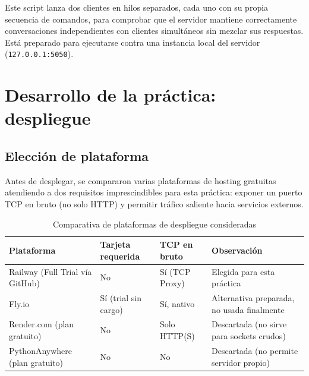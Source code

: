 \documentclass[12pt,a4paper]{article}
\begin{document}


Este script lanza dos clientes en hilos separados, cada uno con su propia secuencia de comandos, para comprobar que el servidor mantiene correctamente conversaciones independientes con clientes simultáneos sin mezclar sus respuestas. Está preparado para ejecutarse contra una instancia local del servidor (\texttt{127.0.0.1:5050}).



\section{Desarrollo de la práctica: despliegue}

\subsection{Elección de plataforma}

Antes de desplegar, se compararon varias plataformas de hosting gratuitas atendiendo a dos requisitos imprescindibles para esta práctica: exponer un puerto TCP en bruto (no solo HTTP) y permitir tráfico saliente hacia servicios externos.

\begin{table}[H]
\centering
\small
\begin{tabular}{@{}llll@{}}
\toprule
\textbf{Plataforma} & \textbf{Tarjeta requerida} & \textbf{TCP en bruto} & \textbf{Observación} \\
\midrule
Railway (Full Trial vía GitHub) & No & Sí (TCP Proxy) & Elegida para esta práctica \\
Fly.io & Sí (trial sin cargo) & Sí, nativo & Alternativa preparada, no usada finalmente \\
Render.com (plan gratuito) & No & Solo HTTP(S) & Descartada (no sirve para sockets crudos) \\
PythonAnywhere (plan gratuito) & No & No & Descartada (no permite servidor propio) \\
\bottomrule
\end{tabular}
\caption{Comparativa de plataformas de despliegue consideradas}
\end{table}
\end{document}
